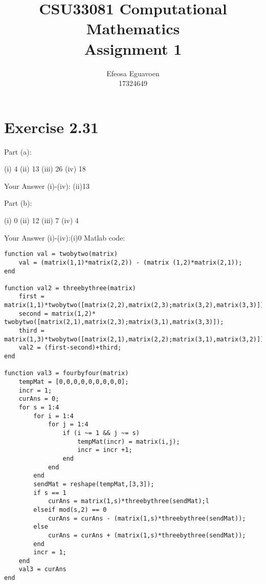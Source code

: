 \documentclass[12pt,a4paper]{report}
\title{CSU33081 Computational Mathematics \\ Assignment 1}
\author{Efeosa Eguavoen \\ 17324649}
\begin{document}
\maketitle
\newpage
\section{Exercise 2.31 }
Part (a):

    (i) 4 
    (ii) 13
    (iii) 26
    (iv) 18

Your Answer (i)-(iv): (ii)13

Part (b):

    (i) 0
    (ii) 12
    (iii)  7
    (iv)  4

Your Answer (i)-(iv):(i)0
\newline
\newline
Matlab code: 
\newline
\begin{lstlisting}
function val = twobytwo(matrix)
    val = (matrix(1,1)*matrix(2,2)) - (matrix (1,2)*matrix(2,1));
end

function val2 = threebythree(matrix)
    first = matrix(1,1)*twobytwo([matrix(2,2),matrix(2,3);matrix(3,2),matrix(3,3)]);
    second = matrix(1,2)* twobytwo([matrix(2,1),matrix(2,3);matrix(3,1),matrix(3,3)]);
    third = matrix(1,3)*twobytwo([matrix(2,1),matrix(2,2);matrix(3,1),matrix(3,2)]);
    val2 = (first-second)+third;
end

function val3 = fourbyfour(matrix)
    tempMat = [0,0,0,0,0,0,0,0,0];
    incr = 1;
    curAns = 0;
    for s = 1:4 
        for i = 1:4
            for j = 1:4
                if (i ~= 1 && j ~= s)
                    tempMat(incr) = matrix(i,j);
                    incr = incr +1;
                end
            end
        end
        sendMat = reshape(tempMat,[3,3]);
        if s == 1
            curAns = matrix(1,s)*threebythree(sendMat);l
        elseif mod(s,2) == 0
            curAns = curAns - (matrix(1,s)*threebythree(sendMat));
        else
            curAns = curAns + (matrix(1,s)*threebythree(sendMat));
        end
        incr = 1;
    end
    val3 = curAns
end

\end{lstlisting}
\end{document}
